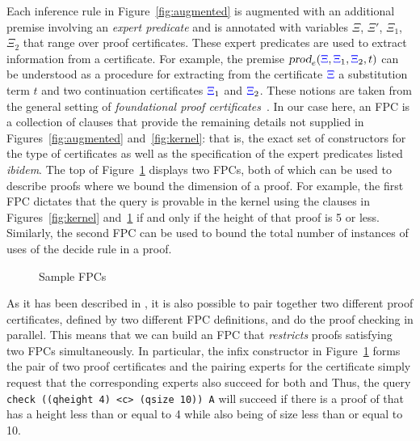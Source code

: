 Each inference rule in Figure~\ref{fig:augmented} is augmented with an
additional premise involving an \emph{expert predicate} and is
annotated with variables $\Xi$, $\Xi'$, $\Xi_1$, $\Xi_2$ that range
over proof certificates.  These expert predicates are used to extract
information from a certificate.  For example, the premise
$\hbox{\sl prod}_e({\color{blue}{\Xi}},{\color{blue}{\Xi}}_1,{\color{blue}{\Xi}}_2,t)$ can be understood as a procedure for
extracting from the certificate ${\color{blue}{\Xi}}$ a substitution term $t$ and two
continuation certificates ${\color{blue}{\Xi}}_1$ and ${\color{blue}{\Xi}}_2$.
%
These notions are taken from the general setting of \emph{foundational
  proof certificates}~\cite{chihani17jar}.
%
In our case here, an FPC is a collection of \lP clauses that provide
the remaining details not supplied in Figures~\ref{fig:augmented}
and~\ref{fig:kernel}: that is, the exact set of constructors for the
type of certificates  as well as the specification of the expert
predicates listed \emph{ibidem}.
%
The top of Figure~\ref{fig:resources} displays two FPCs,
both of which can be used to describe proofs where we bound
the dimension of  a proof.
%
For example, the first FPC dictates that the query \mbox{} is
provable in  the kernel using the clauses in Figures~\ref{fig:kernel}
and~\ref{fig:resources} if and only if the height of that proof is 5
or less.
%
Similarly, the second FPC can be used to bound the total number of instances of uses of the decide rule in a proof.
%

\begin{figure}[t]


\caption{Sample FPCs}
\label{fig:resources}
\end{figure}

As it has been described in \cite{blanco17cade}, it is also possible
to pair together two different proof certificates, defined by two
different FPC definitions, and do the proof checking in parallel.
This means that we can build an FPC that \emph{restricts} proofs
satisfying two FPCs simultaneously.  In particular, the infix
constructor  in Figure~\ref{fig:resources} forms the pair of
two proof certificates and the pairing experts for the certificate
 simply request that the corresponding experts
also succeed for both  and  Thus, the query
\verb+check ((qheight 4) <c> (qsize 10)) A+ will succeed if there is a
proof of  that has a height less than or equal to 4 while also
being of size less than or equal to 10.

